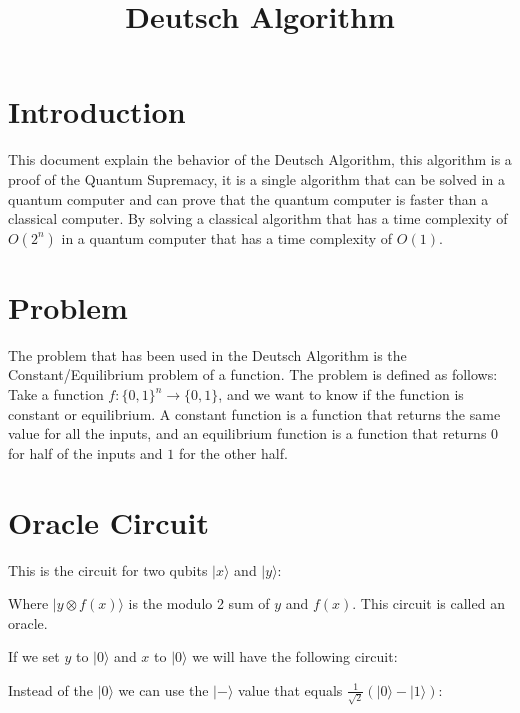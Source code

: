 \documentclass{article}
\begin{document}
\title{Deutsch Algorithm}
\section{Introduction}
This document explain the behavior of the Deutsch Algorithm, this algorithm is a proof
of the Quantum Supremacy, it is a single algorithm that can be solved in a quantum computer
and can prove that the quantum computer is faster than a classical computer. By 
solving a classical algorithm that has a time complexity of $O(2^n)$ in a quantum computer
that has a time complexity of $O(1)$.

\section{Problem}

The problem that has been used in the Deutsch Algorithm is the Constant/Equilibrium problem 
of a function. The problem is defined as follows:
Take a function $f:\{0,1\}^n \rightarrow \{0,1\}$, and we want to know if the function is
constant or equilibrium. A constant function is a function that returns the same value
for all the inputs, and an equilibrium function is a function that returns $0$ for half
of the inputs and $1$ for the other half.

\section{Oracle Circuit}
This is the circuit for two qubits $|x\rangle$ and $|y\rangle$:


Where $|y \otimes f(x)\rangle$ is the modulo 2 sum of $y$ and $f(x)$. This circuit
is called an oracle.

If we set $y$ to $|0\rangle$ and $x$ to $|0\rangle$ we will have the following circuit:


Instead of the $|0\rangle$ we can use the $|-\rangle$ value that equals $\frac{1}{\sqrt{2}}(|0\rangle - |1\rangle)$:

\end{document}
